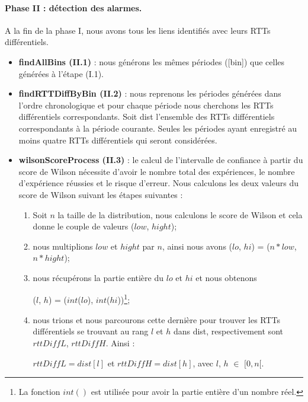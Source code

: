 \paragraph{ Phase II : détection des alarmes.}

A la fin de la phase I, nous avons tous les liens identifiés avec leurs
RTTs différentiels. 

\begin{itemize}
	
	\item \textbf{findAllBins (II.1)} : nous générons les mêmes périodes  ({\color{gray}[bin]}) que celles générées à
	l'étape (I.1).
	\item \textbf{findRTTDiffByBin (II.2)} : nous reprenons les périodes générées dans l'ordre chronologique et
	pour chaque période nous cherchons les RTTs différentiels correspondants. Soit  {\color{gray}dist} l'ensemble des RTTs différentiels correspondants à la période courante.
	Seules les périodes ayant enregistré au moins  quatre RTTs différentiels qui  seront considérées.
	\item \textbf{wilsonScoreProcess (II.3)} : le calcul de l'intervalle de confiance à partir du score de Wilson nécessite d'avoir le nombre total des expériences, le nombre d'expérience réussies et  le risque d'erreur. Nous calculons les deux valeurs du score de Wilson suivant les étapes suivantes :
	
	\begin{enumerate}
		\item Soit $n$ la taille de la distribution, nous calculons le score de Wilson et cela donne le couple de valeurs ($ low $, $ hight $);
		\item nous multiplions $ low $ et $ hight $ par  $n$, ainsi nous avons ($ lo $, $ hi $) =  ($ n*low $, $ n*hight $);
		\item nous récupérons la partie entière du  $ lo $ et $ hi $ et  nous obtenons
		
		($l$, $h$) = ($ int $($ lo $), $ int $($ hi $))\footnote{La fonction $  int() $ est utilisée pour avoir la partie entière d'un nombre réel.};
		\item  nous trions  {\color{gray}{dist}}  et nous parcourons cette dernière pour trouver les RTTs différentiels  se trouvant au rang $  l $ et $ h $ dans {\color{gray}dist}, respectivement sont $ rttDiffL $, $ rttDiffH $. Ainsi :
		
		$ rttDiffL  = dist[l]$  et $ rttDiffH = dist[h]$, avec $l$, $h$ $\in$ $[0,n[$. 
		
	\end{enumerate}
	

\end{itemize}

